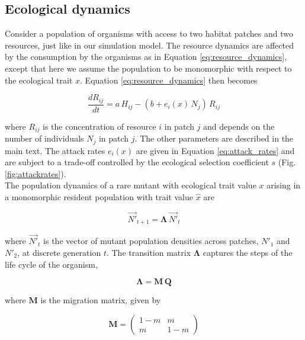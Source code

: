 \subsection*{Ecological dynamics}

Consider a population of organisms with access to two habitat patches and two resources, just like in our simulation model. The resource dynamics are affected by the consumption by the organisms as in Equation \ref{eq:resource_dynamics}, except that here we assume the population to be monomorphic with respect to the ecological trait $x$. Equation \ref{eq:resource_dynamics} then becomes

\begin{equation}
    \frac{dR_{ij}}{dt} = a \, H_{ij} - (b + e_i(x)\, N_j ) \, R_{ij}
\end{equation}

where $R_{ij}$ is the concentration of resource $i$ in patch $j$ and depends on the number of individuals $N_j$ in patch $j$. The other parameters are described in the main text. The attack rates $e_i(x)$ are given in Equation \ref{eq:attack_rates} and are subject to a trade-off controlled by the ecological selection coefficient $s$ (Fig. \ref{fig:attackrates}).\\

The population dynamics of a rare mutant with ecological trait value $x$ arising in a monomorphic resident population with trait value $\hat{x}$ are

\begin{equation}
    \overrightarrow{N'}_{t+1} = \pmb{\Lambda} \, \overrightarrow{N'}_t
\end{equation}

where $\overrightarrow{N'}_t$ is the vector of mutant population densities across patches, $N'_1$ and $N'_2$, at discrete generation $t$. The transition matrix $\pmb{\Lambda}$ captures the steps of the life cycle of the organism,

\begin{equation}
    \pmb{\Lambda} = \pmb{M} \, \pmb{Q}
\end{equation}

where $\pmb{M}$ is the migration matrix, given by

\begin{equation}
    \pmb{M} =
    \begin{pmatrix}
        1-m & m \\
        m & 1-m 
    \end{pmatrix}
\end{equation}

